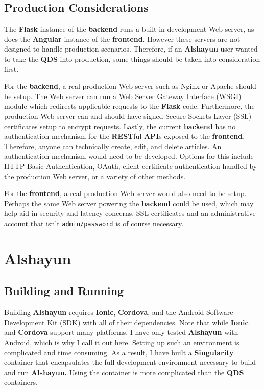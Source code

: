 \documentclass[12pt]{report}
\begin{document}
    \section{Production Considerations}
    
The \textbf{Flask} instance of the \textbf{backend} runs a built-in development
Web server, as does the \textbf{Angular} instance of the \textbf{frontend}.
However these servers are not designed to handle production scenarios.
Therefore, if an \textbf{Alshayun} user wanted to take the \textbf{QDS} into
production, some things should be taken into consideration first.

For the \textbf{backend}, a real production Web server such as Nginx or Apache
should be setup. The Web server can run a Web Server Gateway Interface (WSGI)
module which redirects applicable requests to the \textbf{Flask} code.
Furthermore, the production Web server can and should have signed Secure Sockets
Layer (SSL) certificates setup to encrypt requests. Lastly, the current
\textbf{backend} has no authentication mechanism for the \textbf{REST}ful
\textbf{API}s exposed to the \textbf{frontend}. Therefore, anyone can
technically create, edit, and delete articles. An authentication mechanism would
need to be developed. Options for this include HTTP Basic Authentication, OAuth,
client certificate authentication handled by the production Web server, or a
variety of other methods.

For the \textbf{frontend}, a real production Web server would also need to be
setup. Perhaps the same Web server powering the \textbf{backend} could be used,
which may help aid in security and latency concerns. SSL certificates and an
administrative account that isn't \texttt{admin/password} is of course
necessary.

\chapter{Alshayun}

    \section{Building and Running}

Building \textbf{Alshayun} requires \textbf{Ionic}, \textbf{Cordova}, and the
Android Software Development Kit (SDK) with all of their dependencies. Note that
while \textbf{Ionic} and \textbf{Cordova} support many platforms, I have only
tested \textbf{Alshayun} with Android, which is why I call it out here. Setting
up such an environment is complicated and time consuming. As a result, I have
built a \textbf{Singularity} container that encapsulates the full development
environment necessary to build and run \textbf{Alshayun.} Using the container is
more complicated than the \textbf{QDS} containers.
\end{document}

